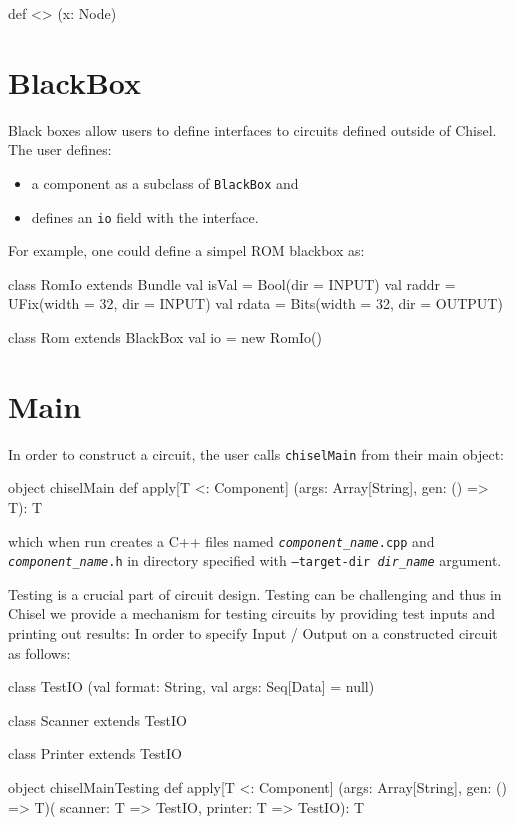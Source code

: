 \documentclass[10pt,twocolumn]{article}
\def\code#1{{\small\tt #1}}
\begin{document}
\begin{scala}
def <> (x: Node)
\end{scala}


\section{BlackBox}

Black boxes allow users to define interfaces to circuits defined
outside of Chisel.  The user defines:

\begin{itemize}
\item a component as a subclass of \code{BlackBox} and
\item defines an \code{io} field with the interface.
\end{itemize}

\noindent
For example, one could define a simpel ROM blackbox as:

\begin{scala}
class RomIo extends Bundle {
  val isVal = Bool(dir = INPUT)
  val raddr = UFix(width = 32, dir = INPUT)
  val rdata = Bits(width = 32, dir = OUTPUT)
}

class Rom extends BlackBox {
  val io = new RomIo()
}
\end{scala}

\section{Main}

In order to construct a circuit, 
the user calls \code{chiselMain} from their main object:

\begin{scala}
object chiselMain {
  def apply[T <: Component]
    (args: Array[String], 
     gen: () => T): T
}
\end{scala}

\noindent
which when run creates a C++ files named
\code{{\it component\_name}.cpp} and \code{{\it component\_name}.h} in directory specified with
\code{--target-dir {\it dir\_name}} argument.

Testing is a crucial part of circuit design.
Testing can be challenging and thus in Chisel we provide a mechanism for
testing circuits by providing test inputs and printing out results:
In order to specify Input / Output on a constructed circuit as follows:

\begin{scala}
class TestIO
  (val format: String, 
   val args: Seq[Data] = null)

class Scanner extends TestIO

class Printer extends TestIO

object chiselMainTesting {
  def apply[T <: Component]
    (args: Array[String], gen: () => T)(
     scanner: T => TestIO, 
     printer: T => TestIO): T
}
\end{scala}
\end{document}
